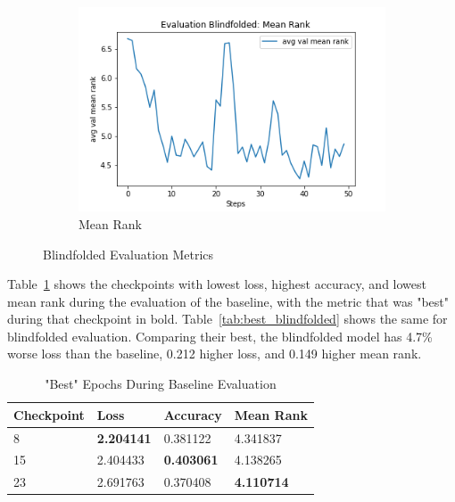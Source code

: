 \begin{figure}[H]
\begin{subfigure}[b]{0.3\textwidth}
         \includegraphics[width=\textwidth]{./figure/results/baseline_and_blindfolding/blindfolded/avg val mean rank.png}
         \caption{Mean Rank}
         \label{fig:blindfolded_mean_rank}
     \end{subfigure}
     \caption{Blindfolded Evaluation Metrics}
     \label{fig:blindfolded_metrics}
\end{figure}
Table~\ref{tab:best_baseline} shows the checkpoints with lowest loss, highest accuracy, and lowest mean rank during the evaluation of the baseline, with the metric that was "best" during that checkpoint in bold. Table~\ref{tab:best_blindfolded} shows the same for blindfolded evaluation. Comparing their best, the blindfolded model has 4.7\% worse loss than the baseline, 0.212 higher loss, and 0.149 higher mean rank. \newline %
\begin{table}[H]
\centering
\caption{"Best" Epochs During Baseline Evaluation}
\begin{tabular}{l | l | l | l}
Checkpoint & Loss & Accuracy & Mean Rank \\
\hline
8 & \textbf{2.204141} & 0.381122 & 4.341837 \\
15 & 2.404433 & \textbf{0.403061} & 4.138265 \\
23 & 2.691763 & 0.370408 & \textbf{4.110714}
\end{tabular}
\label{tab:best_baseline}
\end{table}

